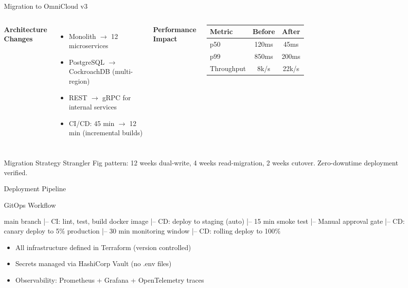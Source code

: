 \documentclass[
  doctype=beamer,
  beameraspectratio=169,
  beamertheme=Berlin,
  institution=generic,
]{omnilatex}
\begin{document}
\begin{frame}{Migration to OmniCloud v3}
  \begin{columns}[T]
    \textbf{Architecture Changes}
    \begin{itemize}
      \item Monolith $\rightarrow$ 12 microservices
      \item PostgreSQL $\rightarrow$ CockroachDB (multi-region)
      \item REST $\rightarrow$ gRPC for internal services
      \item CI/CD: 45 min $\rightarrow$ 12 min (incremental builds)
    \end{itemize}

    \textbf{Performance Impact}
    \begin{table}
      \begin{tabular}{l c c}
        \hline
        Metric    & Before & After \\
        \hline
        p50       & 120ms  & 45ms \\
        p99       & 850ms  & 200ms \\
        Throughput& 8k/s  & 22k/s \\
        \hline
      \end{tabular}
    \end{table}
  \end{columns}

  \vspace{1em}
  \begin{block}{Migration Strategy}
    Strangler Fig pattern: 12 weeks dual-write, 4 weeks read-migration, 2 weeks cutover. Zero-downtime deployment verified.
  \end{block}
\end{frame}

\begin{frame}[fragile]{Deployment Pipeline}
  \begin{block}{GitOps Workflow}
    \begin{semiverbatim}
main branch
  |-- CI: lint, test, build docker image
  |-- CD: deploy to staging (auto)
  |-- 15 min smoke test
  |-- Manual approval gate
  |-- CD: canary deploy to 5\% production
  |-- 30 min monitoring window
  |-- CD: rolling deploy to 100\%
    \end{semiverbatim}
  \end{block}

  \begin{itemize}
    \item All infrastructure defined in Terraform (version controlled)
    \item Secrets managed via HashiCorp Vault (no .env files)
    \item Observability: Prometheus + Grafana + OpenTelemetry traces
  \end{itemize}
\end{frame}
\end{document}
